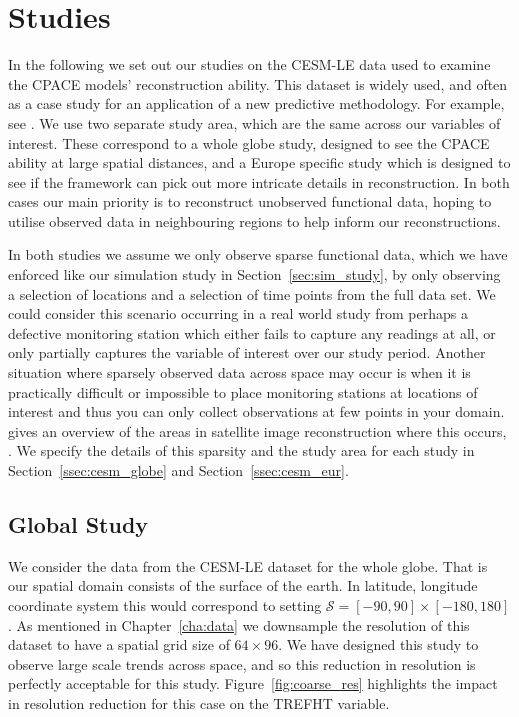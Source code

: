 \section{Studies \label{sec:cesm_study}}
In the following we set out our studies on the CESM-LE data used to examine the CPACE models' reconstruction ability.
This dataset is widely used, and often as a case study for an application of a new predictive methodology.
For example, see \citep{hu_stochastic_2022}.
We use two separate study area, which are the same across our variables of interest.
These correspond to a whole globe study, designed to see the CPACE ability at large spatial distances, and a Europe specific study which is designed to see if the framework can pick out more intricate details in reconstruction. 
In both cases our main priority is to reconstruct unobserved functional data, hoping to utilise observed data in neighbouring regions to help inform our reconstructions.

In both studies we assume we only observe sparse functional data, which we have enforced like our simulation study in Section~\ref{sec:sim_study}, by only observing a selection of locations and a selection of time points from the full data set.
We could consider this scenario occurring in a real world study from perhaps a defective monitoring station which either fails to capture any readings at all, or only partially captures the variable of interest over our study period.
Another situation where sparsely observed data across space may occur is when it is practically difficult or impossible to place monitoring stations at locations of interest and thus you can only collect observations at few points in your domain.
\citeauthor{shen_missing_2015} gives an overview of the areas in satellite image reconstruction where this occurs, \citep{shen_missing_2015}.
We specify the details of this sparsity and the study area for each study in Section~\ref{ssec:cesm_globe} and Section~\ref{ssec:cesm_eur}.

\subsection{Global Study \label{ssec:cesm_globe}}
We consider the data from the CESM-LE dataset for the whole globe.
That is our spatial domain consists of the surface of the earth. In latitude, longitude coordinate system this would correspond to setting $\mathcal{S} = \left[-90, 90\right] \times \left[-180, 180\right]$.
As mentioned in Chapter~\ref{cha:data} we downsample the resolution of this dataset to have  a spatial grid size of $64 \times 96$.
We have designed this study to observe large scale trends across space, and so this reduction in resolution is perfectly acceptable for this study.
Figure~\ref{fig:coarse_res} highlights the impact in resolution reduction for this case on the TREFHT variable.

